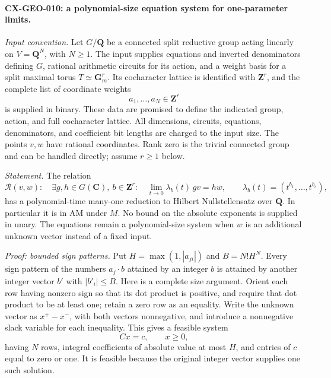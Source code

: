 \documentclass[11pt,a4paper]{article}
\begin{document}
\paragraph{CX-GEO-010: a polynomial-size equation system for one-parameter limits.}
\emph{Input convention.} Let $G/\mathbf Q$ be a connected split reductive
group acting linearly on $V=\mathbf Q^N$, with $N\ge1$.
The input supplies equations and inverted denominators defining $G$,
rational arithmetic circuits for its action, and a weight basis for a
split maximal torus $T\simeq\mathbf G_m^r$. Its cocharacter lattice is
identified with $\mathbf Z^r$, and the complete list of coordinate
weights
\[
                     a_1,\ldots,a_N\in\mathbf Z^r
\]
is supplied in binary. These data are promised to define the indicated
group, action, and full cocharacter lattice. All dimensions, circuits,
equations, denominators, and coefficient bit lengths are charged to the
input size. The points $v,w$ have rational coordinates. Rank zero is the
trivial connected group and can be handled directly; assume $r\ge1$ below.

\emph{Statement.} The relation
\[
 \mathcal R(v,w):\quad
 \exists g,h\in G(\mathbf C),\ b\in\mathbf Z^r:\quad
       \lim_{t\longrightarrow0}\lambda_b(t)\,g v=h w,
 \qquad \lambda_b(t)=(t^{b_1},\ldots,t^{b_r}),
\]
has a polynomial-time many-one reduction to Hilbert Nullstellensatz over
$\mathbf Q$. In particular it is in AM under $M$. No bound on the
absolute exponents is supplied in unary. The equations remain a
polynomial-size system when $w$ is an additional unknown vector instead
of a fixed input.

\emph{Proof: bounded sign patterns.} Put
$H=\max(1,|a_{ji}|)$ and $B=N!H^N$.
Every sign pattern of the numbers $a_j\cdot b$ attained by an integer
$b$ is attained by another integer vector $b'$ with $|b'_i|\le B$.
Here is a complete size argument. Orient each row having nonzero sign
so that its dot product is positive, and require that dot product to be
at least one; retain a zero row as an equality. Write the unknown vector
as $x^+-x^-$, with both vectors nonnegative, and introduce a nonnegative
slack variable for each inequality. This gives a feasible system
\[
                       Cx=c,\qquad x\ge0,
\]
having $N$ rows, integral coefficients of absolute value at most $H$,
and entries of $c$ equal to zero or one. It is feasible because the
original integer vector supplies one such solution.
\end{document}
